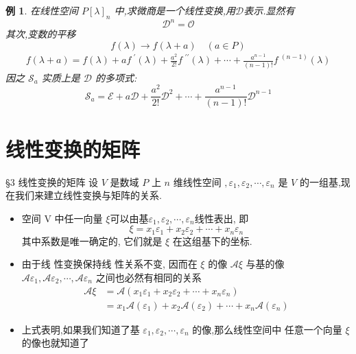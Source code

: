 \documentclass[13pt]{beamer}
\newtheorem{exa}{例}
\def\A{\mathscr{A}}
\def\O{\mathscr{O}}
\begin{document}
\begin{frame}
\begin{exa}
在线性空间 $P[\lambda]_{n}$ 中,求微商是一个线性变换,用$\mathscr{D}$表示.显然有
\[
\mathscr{D}^{n}=\O
\]
其次,变数的平移
\[
f(\lambda) \rightarrow f(\lambda+a) \quad(a \in P)
\]
\[
\begin{aligned}
f(\lambda+a)=f(\lambda)+a f^{\,\,\prime}(\lambda)+\frac{a^{2}}{2 !} f^{\, \, \prime \prime}(\lambda)+\cdots
+\frac{a^{n-1}}{(n-1) !} f^{\,\, (n-1)}(\lambda)
\end{aligned}
\]
因之 $\mathscr{S}_{a}$ 实质上是 $\mathscr{D}$ 的多项式:
\[
\mathscr{S}_{a}=\mathscr{E}+a \mathscr{D}+\frac{a^{2}}{2 !} \mathscr{D}^{2}+\cdots+\frac{a^{n-1}}{(n-1) !} {\mathscr{D}^{n-1}}
\]
\end{exa} 
\end{frame}


\section{线性变换的矩阵}
\begin{frame}{\S 3 线性变换的矩阵}
设 $V$ 是数域 $P$ 上 $n$ 维线性空间 $, {\varepsilon}_{1}, {\varepsilon}_{2}, \cdots, {\varepsilon}_{n}$ 是 $V$ 的一组基,现在我们来建立线性变换与矩阵的关系. 
\begin{itemize}
	\item 
空间 V 中任一向量 $\xi$可以由基${\varepsilon}_{1}, {\varepsilon}_{2}, \cdots, {\varepsilon}_{n}$线性表出, 即
\[
\xi=x_{1} \varepsilon_{1}+x_{2} \varepsilon_{2}+\cdots+x_{n} \varepsilon_{n}
\]
其中系数是唯一确定的, 它们就是 $\xi$ 在这组基下的坐标. 

	\item  由于线 性变换保持线 性关系不变, 因而在 $\xi$ 的像 $\A\xi$ 与基的像 $\A{\varepsilon}_{1}, \mathscr{A} {\varepsilon}_{2}, \cdots, \mathscr{A} {\varepsilon}_{n}$ 之间也必然有相同的关系 
\[
\begin{aligned}
\mathscr{A} {\xi} &=\mathscr{A}\left(x_{1} {\varepsilon}_{1}+x_{2} {\varepsilon}_{2}+\cdots+x_{n} {\varepsilon}_{n}\right) \\
&=x_{1} \mathscr{A}\left({\varepsilon}_{1}\right)+x_{2} \mathscr{A}\left({\varepsilon}_{2}\right)+\cdots+x_{n} \mathscr{A}\left({\varepsilon}_{n}\right)
\end{aligned}
\]

	\item 上式表明,如果我们知道了基 ${\varepsilon}_{1}, {\varepsilon}_{2}, \cdots, {\varepsilon}_{n}$ 的像,那么线性空间中
任意一个向量 $\xi$ 的像也就知道了
\end{itemize}
\end{frame}
\end{document}
